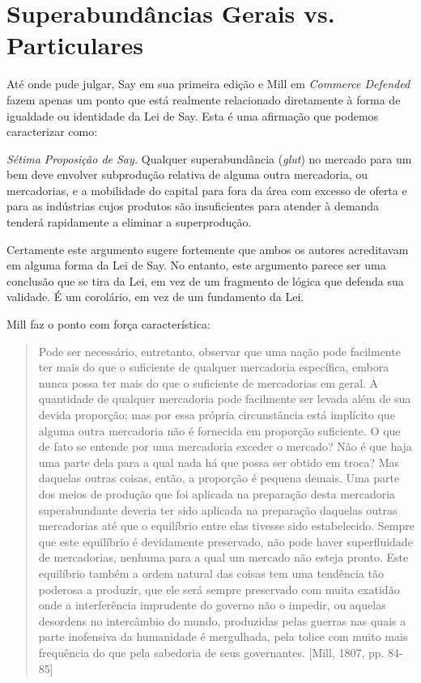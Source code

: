 \documentclass[12pt]{article}
\begin{document}
\section{Superabundâncias Gerais vs. Particulares}

Até onde pude julgar, Say em sua primeira edição e Mill em \textit{Commerce Defended} fazem apenas um ponto que está realmente relacionado diretamente à forma de igualdade ou identidade da Lei de Say. Esta é uma afirmação que podemos caracterizar como:

\textit{Sétima Proposição de Say.} Qualquer superabundância (\textit{glut}) no mercado para um bem deve envolver subprodução relativa de alguma outra mercadoria, ou mercadorias, e a mobilidade do capital para fora da área com excesso de oferta e para as indústrias cujos produtos são insuficientes para atender à demanda tenderá rapidamente a eliminar a superprodução.

Certamente este argumento sugere fortemente que ambos os autores acreditavam em alguma forma da Lei de Say. No entanto, este argumento parece ser uma conclusão que se tira da Lei, em vez de um fragmento de lógica que defenda sua validade. É um corolário, em vez de um fundamento da Lei.

Mill faz o ponto com força característica:

\begin{quote}
Pode ser necessário, entretanto, observar que uma nação pode facilmente ter mais do que o suficiente de qualquer mercadoria específica, embora nunca possa ter mais do que o suficiente de mercadorias em geral. A quantidade de qualquer mercadoria pode facilmente ser levada além de sua devida proporção; mas por essa própria circunstância está implícito que alguma outra mercadoria não é fornecida em proporção suficiente. O que de fato se entende por uma mercadoria exceder o mercado? Não é que haja uma parte dela para a qual nada há que possa ser obtido em troca? Mas daquelas outras coisas, então, a proporção é pequena demais. Uma parte dos meios de produção que foi aplicada na preparação desta mercadoria superabundante deveria ter sido aplicada na preparação daquelas outras mercadorias até que o equilíbrio entre elas tivesse sido estabelecido. Sempre que este equilíbrio é devidamente preservado, não pode haver superfluidade de mercadorias, nenhuma para a qual um mercado não esteja pronto. Este equilíbrio também a ordem natural das coisas tem uma tendência tão poderosa a produzir, que ele será sempre preservado com muita exatidão onde a interferência imprudente do governo não o impedir, ou aquelas desordens no intercâmbio do mundo, produzidas pelas guerras nas quais a parte inofensiva da humanidade é mergulhada, pela tolice com muito mais frequência do que pela sabedoria de seus governantes. [Mill, 1807, pp. 84-85]
\end{quote}
\end{document}
